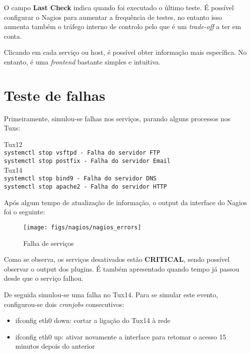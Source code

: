 O campo \textbf{Last Check} indica quando foi executado o último teste.
É possível configurar o Nagios para aumentar a frequência de testes, no entanto isso aumenta também o tráfego interno de controlo pelo que é um \textit{trade-off} a ter em conta.

Clicando em cada serviço ou host, é possível obter informação mais específica.
No entanto, é uma \textit{frontend} bastante simples e intuitiva.

\pagebreak

\section{Teste de falhas}

Primeiramente, simulou-se falhas nos serviços, parando alguns processos nos Tuxs:

\begin{center}
    Tux12 \\
    \verb|systemctl stop vsftpd - Falha do servidor FTP| \\
    \verb|systemctl stop postfix - Falha do servidor Email| \\

    \vspace{1cm}
    Tux14 \\
    \verb|systemctl stop bind9 - Falha do servidor DNS| \\
    \verb|systemctl stop apache2 - Falha do servidor HTTP|
\end{center}

Após algum tempo de atualização de informação, o output da interface do Nagios foi o seguinte:

\begin{figure}[H]
    \centering
    \texttt{[image: figs/nagios/nagios\_errors]}
    \caption{Falha de serviços}
    \label{fig:nagios_errors}
\end{figure}

Como se observa, os serviços desativados estão \textbf{CRITICAL}, sendo possível observar o output dos plugins.
É também apresentado quando tempo já passou desde que o serviço falhou.

De seguida simulou-se uma falha no Tux14.
Para se simular este evento, configurou-se dois \textit{cronjobs} consecutivos:
\begin{itemize}
    \item ifconfig eth0 down: cortar a ligação do Tux14 à rede
    \item ifconfig eth0 up: ativar novamente a interface para retomar o acesso 15 minutos depois do anterior
\end{itemize}

